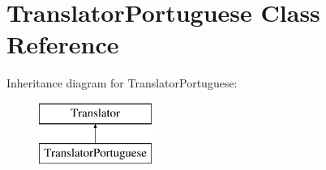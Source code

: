 \hypertarget{class_translator_portuguese}{}\section{Translator\+Portuguese Class Reference}
\label{class_translator_portuguese}
Inheritance diagram for Translator\+Portuguese\+:\begin{figure}[H]
\begin{center}
\leavevmode
\includegraphics[height=2.000000cm]{class_translator_portuguese}
\end{center}
\end{figure}
